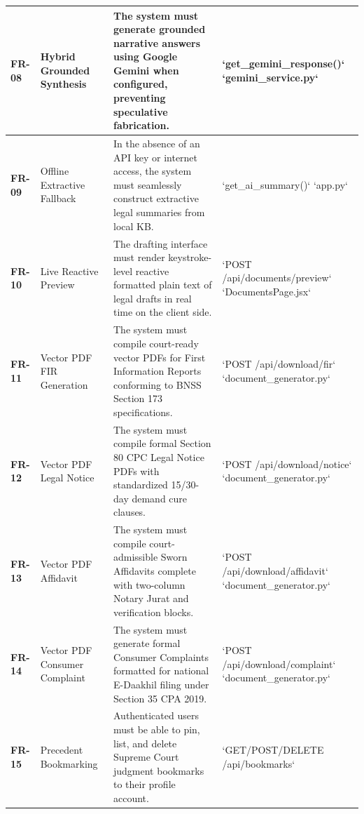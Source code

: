 \begin{table}[H]
\begin{tabularx}{\textwidth}{lp{3.5cm}Xp{2.8cm}}
\midrule
\textbf{FR-08} & Hybrid Grounded Synthesis & The system must generate grounded narrative answers using Google Gemini when configured, preventing speculative fabrication. & `get_gemini_response()` \newline `gemini_service.py` \\
\midrule
\textbf{FR-09} & Offline Extractive Fallback & In the absence of an API key or internet access, the system must seamlessly construct extractive legal summaries from local KB. & `get_ai_summary()` \newline `app.py` \\
\midrule
\textbf{FR-10} & Live Reactive Preview & The drafting interface must render keystroke-level reactive formatted plain text of legal drafts in real time on the client side. & `POST /api/documents/preview` \newline `DocumentsPage.jsx` \\
\midrule
\textbf{FR-11} & Vector PDF FIR Generation & The system must compile court-ready vector PDFs for First Information Reports conforming to BNSS Section 173 specifications. & `POST /api/download/fir` \newline `document_generator.py` \\
\midrule
\textbf{FR-12} & Vector PDF Legal Notice & The system must compile formal Section 80 CPC Legal Notice PDFs with standardized 15/30-day demand cure clauses. & `POST /api/download/notice` \newline `document_generator.py` \\
\midrule
\textbf{FR-13} & Vector PDF Affidavit & The system must compile court-admissible Sworn Affidavits complete with two-column Notary Jurat and verification blocks. & `POST /api/download/affidavit` \newline `document_generator.py` \\
\midrule
\textbf{FR-14} & Vector PDF Consumer Complaint & The system must generate formal Consumer Complaints formatted for national E-Daakhil filing under Section 35 CPA 2019. & `POST /api/download/complaint` \newline `document_generator.py` \\
\midrule
\textbf{FR-15} & Precedent Bookmarking & Authenticated users must be able to pin, list, and delete Supreme Court judgment bookmarks to their profile account. & `GET/POST/DELETE /api/bookmarks` \\
\bottomrule
\end{tabularx}
\end{table}

